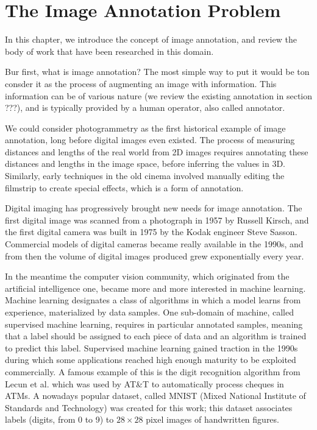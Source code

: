 \chapter{The Image Annotation Problem}%
\label{cha:the_image_annotation_problem}

\adjustmtc
\minitoc%

In this chapter, we introduce the concept of image annotation, and review the body of work that have been researched in this domain. 

Bur first, what is image annotation? The most simple way to put it would be ton consder it as the process of augmenting an image with information. This information can be of various nature (we review the existing annotation in section ???), and is typically provided by a human operator, also called annotator. 

We could consider photogrammetry as the first historical example of image annotation, long before digital images even existed. The process of measuring distances and lengths of the real world from 2D images requires annotating these distances and lengths in the image space, before inferring the values in 3D. Similarly, early techniques in the old cinema involved manually editing the filmstrip to create special effects, which is a form of annotation.

Digital imaging has progressively brought new needs for image annotation. The first digital image was scanned from a photograph in 1957 by Russell Kirsch, and the first digital camera was built in 1975 by the Kodak engineer Steve Sasson. Commercial models of digital cameras became really available in the 1990s, and from then the volume of digital images produced grew exponentially every year.

In the meantime the computer vision community, which originated from the artificial intelligence one, became more and more interested in machine learning. Machine learning designates a class of algorithms in which a model learns from experience, materialized by data samples. One sub-domain of machine, called supervised machine learning, requires in particular annotated samples, meaning that a label should be assigned to each piece of data and an algorithm is trained to predict this label. Supervised machine learning gained traction in the 1990s during which some applications reached high enough maturity to be exploited commercially. A famous example of this is the digit recognition algorithm from Lecun et al. \cite{blabla} which was used by AT&T to automatically process cheques in ATMs. A nowadays popular dataset, called MNIST (Mixed National Institute of Standards and Technology) was created for this work; this dataset associates labels (digits, from 0 to 9) to $28\times 28$ pixel images of handwritten figures. 

